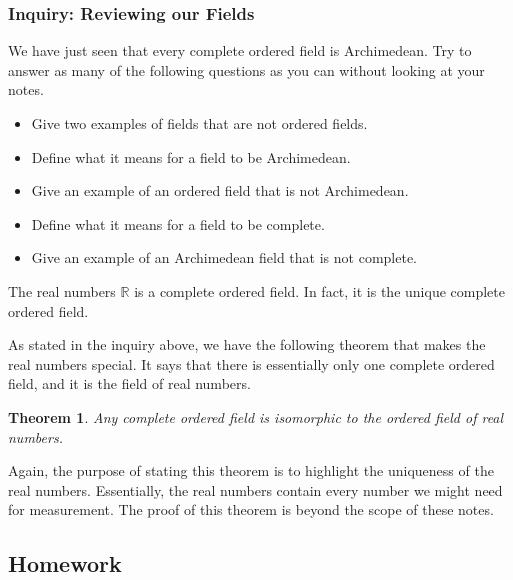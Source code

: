\documentclass[11pt]{article}
\newenvironment{task}
	{\begin{mdframed}[linecolor=lightgray, linewidth=3pt]\raggedright}
	{\end{mdframed}}
\newtheorem{theorem}{Theorem}[section]
\theoremstyle{definition}
\begin{document}
\subsubsection{Inquiry: Reviewing our Fields}

\begin{task}
  We have just seen that every complete ordered field is Archimedean. Try to answer as many of the following questions as you can
  without looking at your notes.
  \begin{itemize}
    \item Give two examples of fields that are not ordered fields.
    \item Define what it means for a field to be Archimedean.
    \item Give an example of an ordered field that is not Archimedean.
    \item Define what it means for a field to be complete.
    \item Give an example of an Archimedean field that is not complete.
  \end{itemize}
  The real numbers $\mathbb{R}$ is a complete ordered field. In fact, it is the unique complete ordered field.
  
\end{task}

As stated in the inquiry above, we have the following theorem that makes the real numbers special. It says that there is
essentially only one complete ordered field, and it is the field of real numbers.

\begin{theorem}
  Any complete ordered field is isomorphic to the ordered field of real numbers.
  \label{theorem: reals are unique}
\end{theorem}

Again, the purpose of stating this theorem is to highlight the uniqueness of the real numbers. Essentially, the real numbers contain every number
we might need for measurement. The proof of this theorem is beyond the scope of these notes.

\newpage \subsection{Homework}  
\end{document}
